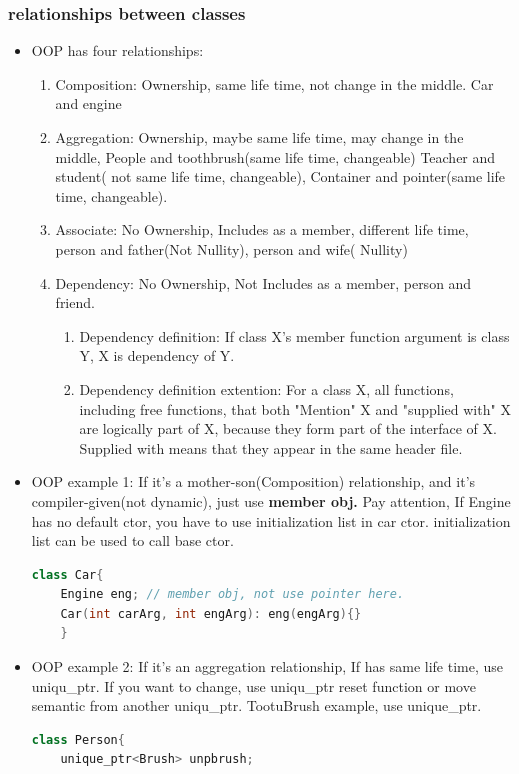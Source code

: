 \documentclass[a4paper,12pt,twoside]{book}
\begin{document}
\subsubsection{relationships between classes}
\begin{itemize}
	\item OOP has four relationships:
	\begin{enumerate}
		\item Composition: Ownership, same life time,  not change in the middle. Car and engine
		\item Aggregation: Ownership, maybe same life time, may change in the middle, People and toothbrush(same life time, changeable) Teacher and student( not same life time, changeable), Container and pointer(same life time, changeable).
		\item Associate: No Ownership, Includes as a member,  different life time,  person and father(Not Nullity), person and wife( Nullity)
		\item Dependency: No Ownership, Not Includes as a member, person and friend.
		\begin{enumerate}
			\item Dependency definition: If class X's member function argument is class Y, X is dependency of Y.
			\item Dependency definition extention: For a class X, all functions, including free functions, that both "Mention" X and "supplied with" X are logically part of X, because they form part of the interface of X. Supplied with means that they appear in the same header file.
		\end{enumerate}
	\end{enumerate}
	
	\item OOP example 1: If it's a mother-son(Composition) relationship, and it's compiler-given(not dynamic), just use \textbf{member obj.}   Pay attention, If Engine has no default ctor, you have to use initialization list in car ctor.  initialization list can be used to call base ctor.
	\begin{lstlisting}[frame=single, language=c++]
	class Car{
	Engine eng; // member obj, not use pointer here.
	Car(int carArg, int engArg): eng(engArg){}
	}
	\end{lstlisting}
	
	\item OOP example 2:  If it's an aggregation relationship, If has same life time, use uniqu\_ptr. If you want to change, use uniqu\_ptr reset function or move semantic from another uniqu\_ptr.   TootuBrush example, use unique\_ptr.
	\begin{lstlisting}[frame=single, language=c++]
	class Person{
	unique_ptr<Brush> unpbrush;
	

\end{lstlisting}
\end{itemize}
\end{document}
